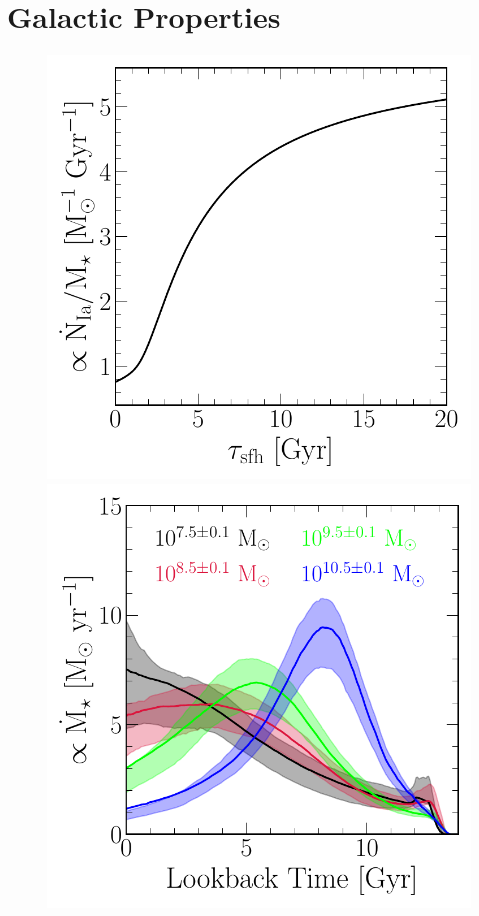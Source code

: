 \documentclass[ms.tex]{subfiles}
\begin{document}
\section{Galactic Properties}
\label{sec:galprops}

\begin{figure}
\centering
\includegraphics[scale = 0.42]{iarate_vs_tausfh.pdf}
\includegraphics[scale = 0.43]{umachine_sfhs.pdf}

\end{figure}
\end{document}
